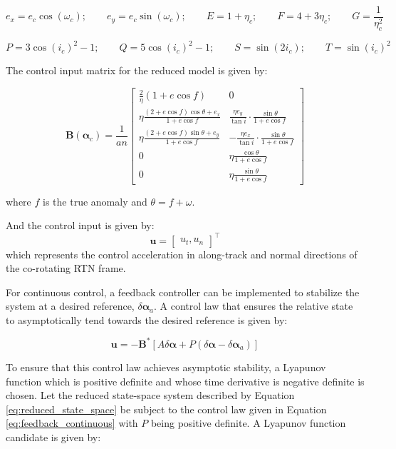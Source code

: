 \[
e_x = e_c \cos(\omega_c); \qquad e_y = e_c \sin(\omega_c); \qquad E = 1 + \eta_c; \qquad F = 4 + 3 \eta_c; \qquad G = \frac{1}{\eta_c^2}
\]

\[
P = 3 \cos(i_c)^2 - 1; \qquad Q = 5 \cos(i_c)^2 - 1; \qquad S = \sin(2 i_c); \qquad T = \sin(i_c)^2
\]

The control input matrix for the reduced model is given by:

\begin{equation}
\bm{B}(\bm{\alpha}_c) = \frac{1}{a n}
\begin{bmatrix}
\frac{2}{\eta}(1 + e \cos f) & 0 \\
\eta \frac{(2 + e \cos f) \cos \theta + e_x}{1 + e \cos f} & \frac{\eta e_y}{\tan i} \cdot \frac{\sin \theta}{1 + e \cos f} \\
\eta \frac{(2 + e \cos f) \sin \theta + e_y}{1 + e \cos f} & -\frac{\eta e_x}{\tan i} \cdot \frac{\sin \theta}{1 + e \cos f} \\
0 & \eta \frac{\cos \theta}{1 + e \cos f} \\
0 & \eta \frac{\sin \theta}{1 + e \cos f}
\end{bmatrix}
\end{equation} \label{eq:continuous_control_B}

where \( f \) is the true anomaly and \( \theta = f + \omega \).

And the control input is given by:
\begin{equation}
\bm{u} = \begin{bmatrix} u_t, u_n \end{bmatrix}^\top
\end{equation}
which represents the control acceleration in along-track and normal directions of the co-rotating RTN frame.

For continuous control, a feedback controller can be implemented to stabilize the system at a desired reference, $\delta \boldsymbol{\alpha}_a$. A control law that ensures the relative state to asymptotically tend towards the desired reference is given by: 

\begin{equation}
\mathbf{u} = -\mathbf{B}^* \left[ A \delta \boldsymbol{\alpha} + P \left( \delta \boldsymbol{\alpha} - \delta \boldsymbol{\alpha}_a \right) \right]
\label{eq:feedback_continuous}
\end{equation}

To ensure that this control law achieves asymptotic stability, a Lyapunov function which is positive definite and whose time derivative is negative definite is chosen. Let the reduced state-space system described by Equation \ref{eq:reduced_state_space} be subject to the control law given in Equation \ref{eq:feedback_continuous} with $P$ being positive definite. A Lyapunov function candidate is given by:

